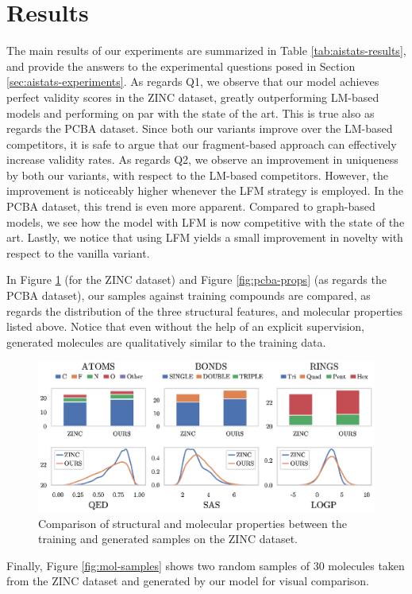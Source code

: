\section{Results}
The main results of our experiments are summarized in Table \ref{tab:aistats-results}, and provide the answers to the experimental questions posed in Section \ref{sec:aistats-experiments}. As regards Q1, we observe that our model achieves perfect validity scores in the ZINC dataset, greatly outperforming LM-based models and performing on par with the state of the art. This is true also as regards the PCBA dataset. Since both our variants improve over the LM-based competitors, it is safe to argue that our fragment-based approach can effectively increase validity rates. As regards Q2, we observe an improvement in uniqueness by both our variants, with respect to the LM-based competitors. However, the improvement is noticeably higher whenever the LFM strategy is employed. In the PCBA dataset, this trend is even more apparent. Compared to graph-based models, we see how the model with LFM is now competitive with the state of the art. Lastly, we notice that using LFM yields a small improvement in novelty with respect to the vanilla variant.

In Figure \ref{fig:zinc-props} (for the ZINC dataset) and Figure \ref{fig:pcba-props} (as regards the PCBA dataset), our samples against training compounds are compared, as regards the distribution of the three structural features, and molecular properties listed above. Notice that even without the help of an explicit supervision, generated molecules are qualitatively similar to the training data.
\begin{figure}[h!]
    \centering
    \includegraphics[width=.95\textwidth]{Figures/Chapter7/props-zinc.eps}
    \caption{Comparison of structural and molecular properties between the training and generated samples on the ZINC dataset.}
    \label{fig:zinc-props}
\end{figure}
Finally, Figure \ref{fig:mol-samples} shows two random samples of 30 molecules taken from the ZINC dataset and generated by our model for visual comparison.
